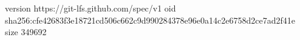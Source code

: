 version https://git-lfs.github.com/spec/v1
oid sha256:cfe42683f3e18721cd506c662c9d990284378e96e0a14c2e6758d2ce7ad2f41e
size 349692
